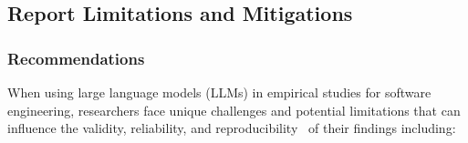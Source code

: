 



\subsection{Report Limitations and Mitigations}
\subsubsection{Recommendations}
When using large language models (LLMs) in empirical studies for software engineering, researchers face unique challenges and potential limitations that can influence the validity, reliability, and reproducibility~\cite{sallou2024breaking} of their findings including:

